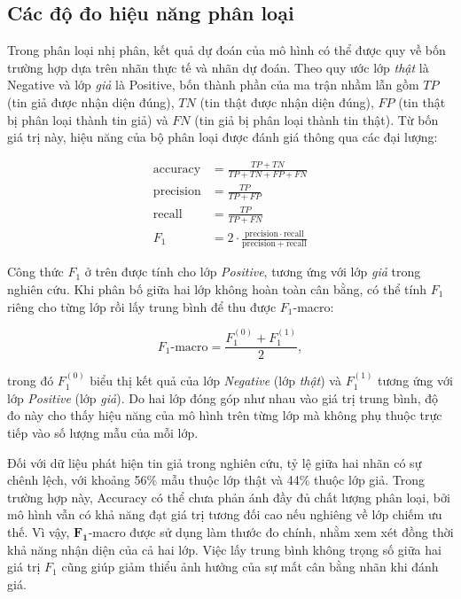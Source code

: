 \subsection{Các độ đo hiệu năng phân loại}

Trong phân loại nhị phân, kết quả dự đoán của mô hình có thể được quy về bốn trường hợp dựa trên nhãn thực tế và nhãn dự đoán. Theo quy ước lớp \textit{thật} là Negative và lớp \textit{giả} là Positive, bốn thành phần của ma trận nhầm lẫn gồm $TP$ (tin giả được nhận diện đúng), $TN$ (tin thật được nhận diện đúng), $FP$ (tin thật bị phân loại thành tin giả) và $FN$ (tin giả bị phân loại thành tin thật). Từ bốn giá trị này, hiệu năng của bộ phân loại được đánh giá thông qua các đại lượng:

\begin{align*}
\mathrm{accuracy}    &= \frac{TP+TN}{TP+TN+FP+FN} \\
\mathrm{precision}  &= \frac{TP}{TP+FP} \\
\mathrm{recall}     &= \frac{TP}{TP+FN} \\
F_1                 &= 2 \cdot \frac{\mathrm{precision} \cdot \mathrm{recall}}{\mathrm{precision} + \mathrm{recall}}
\end{align*}

Công thức $F_1$ ở trên được tính cho lớp \textit{Positive}, tương ứng với lớp \textit{giả} trong nghiên cứu. Khi phân bố giữa hai lớp không hoàn toàn cân bằng, có thể tính $F_1$ riêng cho từng lớp rồi lấy trung bình để thu được $F_1$-macro:

\[
F_1\text{-macro} = \frac{F_1^{(0)} + F_1^{(1)}}{2},
\]

trong đó $F_1^{(0)}$ biểu thị kết quả của lớp \textit{Negative} (lớp \textit{thật}) và $F_1^{(1)}$ tương ứng với lớp \textit{Positive} (lớp \textit{giả}). Do hai lớp đóng góp như nhau vào giá trị trung bình, độ đo này cho thấy hiệu năng của mô hình trên từng lớp mà không phụ thuộc trực tiếp vào số lượng mẫu của mỗi lớp.

Đối với dữ liệu phát hiện tin giả trong nghiên cứu, tỷ lệ giữa hai nhãn có sự chênh lệch, với khoảng 56\% mẫu thuộc lớp thật và 44\% thuộc lớp giả. Trong trường hợp này, Accuracy có thể chưa phản ánh đầy đủ chất lượng phân loại, bởi mô hình vẫn có khả năng đạt giá trị tương đối cao nếu nghiêng về lớp chiếm ưu thế. Vì vậy, $\mathbf{F_1}$-macro được sử dụng làm thước đo chính, nhằm xem xét đồng thời khả năng nhận diện của cả hai lớp. Việc lấy trung bình không trọng số giữa hai giá trị $F_1$ cũng giúp giảm thiểu ảnh hưởng của sự mất cân bằng nhãn khi đánh giá.


